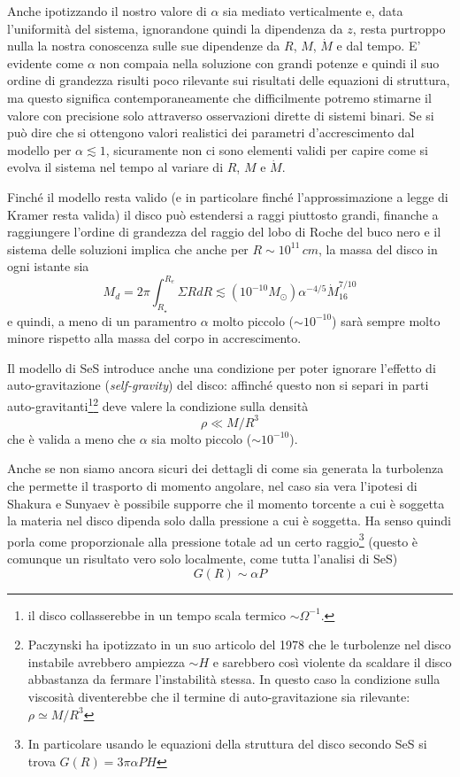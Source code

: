 \documentclass[a4paperbi]{article}
\begin{document}
	Anche ipotizzando il nostro valore di $\alpha$ sia mediato verticalmente e, data l'uniformità del sistema, ignorandone quindi la dipendenza da $z$, resta purtroppo nulla la nostra conoscenza sulle sue dipendenze da $R$, $M$, $\dot{M}$ e dal tempo.
	E' evidente come $\alpha$ non compaia nella soluzione con grandi potenze e quindi il suo ordine di grandezza risulti poco rilevante sui risultati delle equazioni di struttura, ma questo significa contemporaneamente che difficilmente potremo stimarne il valore con precisione solo attraverso osservazioni dirette di sistemi binari. 	
	Se si può dire che si ottengono valori realistici dei parametri d'accrescimento dal modello per $\alpha\lesssim1$, sicuramente non ci sono elementi validi per capire come si evolva il sistema nel tempo al variare di $R$, $M$ e $\dot{M}$.
	
	Finché il modello resta valido (e in particolare finché l'approssimazione a legge di Kramer resta valida) il disco può estendersi a raggi piuttosto grandi, finanche a raggiungere l'ordine di grandezza del raggio del lobo di Roche del buco nero e il sistema delle soluzioni implica che anche per $R\sim10^{11}\,cm$, la massa del disco in ogni istante sia
	\begin{equation}
		M_d=2\pi\int^{R_{e}}_{R_\star}\Sigma RdR\lesssim (10^{-10}M_\odot)\alpha^{-4/5}\dot{M}^{7/10}_{16}
	\end{equation}
	e quindi, a meno di un paramentro $\alpha$ molto piccolo ($\sim10^{-10}$) sarà sempre molto minore rispetto alla massa del corpo in accrescimento.
	
	Il modello di SeS introduce anche una condizione per poter ignorare l'effetto di auto-gravitazione (\textit{self-gravity}) del disco: affinché questo non si separi in parti auto-gravitanti\footnote{il disco collasserebbe in un tempo scala termico $\sim\Omega^{-1}$.}\footnote{Paczynski ha ipotizzato in un suo articolo del 1978 che le turbolenze nel disco instabile avrebbero ampiezza $\sim H$ e sarebbero così violente da scaldare il disco abbastanza da fermare l'instabilità stessa. In questo caso la condizione sulla viscosità diventerebbe che il termine di auto-gravitazione sia rilevante: $\rho\simeq M/R^3$} deve valere la condizione sulla densità
		\begin{equation}
			\rho\ll M/R^3
		\end{equation}
	che è valida a meno che $\alpha$ sia molto piccolo ($\sim10^{-10}$).
	
	Anche se non siamo ancora sicuri dei dettagli di come sia generata la turbolenza che permette il trasporto di momento angolare, nel caso sia vera l'ipotesi di Shakura e Sunyaev è possibile supporre che il momento torcente a cui è soggetta la materia nel disco dipenda solo dalla pressione a cui è soggetta. Ha senso quindi porla come proporzionale alla pressione totale ad un certo raggio\footnote{In particolare usando le equazioni della struttura del disco secondo SeS si trova $G(R)=3\pi\alpha PH$} (questo è comunque un risultato vero solo localmente, come tutta l'analisi di SeS)
	\begin{equation}
		G(R)\sim\alpha P
	\end{equation}
	
\end{document}
